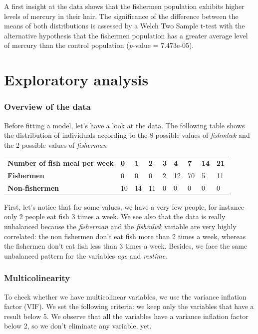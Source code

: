 \documentclass[12pt,]{article}
\begin{document}
A first insight at the data shows that the fishermen population exhibits
higher levels of mercury in their hair. The significance of the
difference between the means of both distributions is assessed by a
Welch Two Sample t-test with the alternative hypothesis that the
fishermen population has a greater average level of mercury than the
control population (\emph{p}-value = 7.473e-05).

\section{Exploratory analysis}\label{exploratory-analysis}

\subsubsection{Overview of the data}\label{overview-of-the-data}

Before fitting a model, let's have a look at the data. The following
table shows the distribution of individuals according to the 8 possible
values of \emph{fishmlwk} and the 2 possible values of \emph{fisherman}

\begin{longtable}[]{@{}lllllllll@{}}
\toprule
\textbf{Number of fish meal per week} & \textbf{0} & \textbf{1} &
\textbf{2} & \textbf{3} & \textbf{4} & \textbf{7} & \textbf{14} &
\textbf{21}\tabularnewline
\textbf{Fishermen} & 0 & 0 & 0 & 2 & 12 & 70 & 5 & 11\tabularnewline
\textbf{Non-fishermen} & 10 & 14 & 11 & 0 & 0 & 0 & 0 & 0\tabularnewline
\bottomrule
\end{longtable}

First, let's notice that for some values, we have a very few people, for
instance only 2 people eat fish 3 times a week. We see also that the
data is really unbalanced because the \emph{fisherman} and the
\emph{fishmlwk} variable are very highly correlated: the non fishermen
don't eat fish more than 2 times a week, whereas the fishermen don't eat
fish less than 3 times a week. Besides, we face the same unbalanced
pattern for the variables \emph{age} and \emph{restime}.

\subsubsection{Multicolinearity}\label{multicolinearity}

To check whether we have multicolinear variables, we use the variance
inflation factor (VIF). We set the following criteria: we keep only the
variables that have a result below 5. We observe that all the variables
have a variance inflation factor below 2, so we don't eliminate any
variable, yet.
\end{document}
